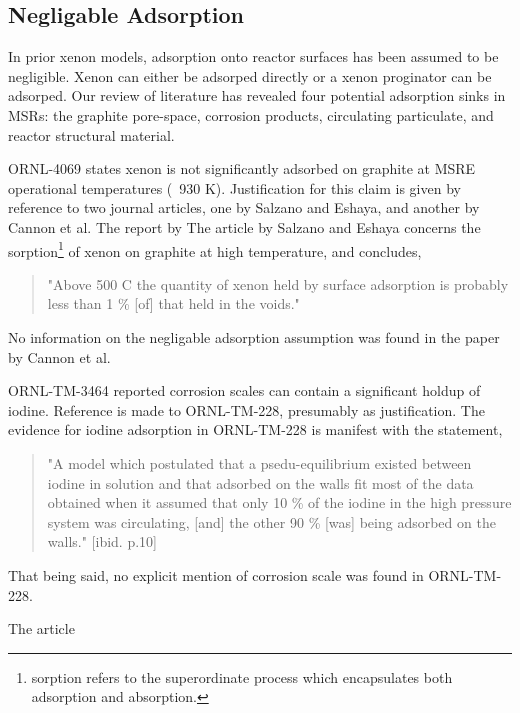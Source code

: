\subsection{Negligable Adsorption}
In prior xenon models, adsorption onto reactor surfaces has been assumed to be negligible.  Xenon can either be adsorped directly or a xenon proginator can be adsorped.  Our review of literature has revealed four potential adsorption sinks in MSRs: the graphite pore-space, corrosion products, circulating particulate, and reactor structural material. 

ORNL-4069 states xenon is not significantly adsorbed on graphite at MSRE operational temperatures (~930 K). \cite[p. 42]{ORNL4069}  Justification for this claim is given by reference to two journal articles, one by Salzano and Eshaya, and another by Cannon et al.  The report by The article by Salzano and Eshaya concerns the sorption\footnote{sorption refers to the superordinate process which encapsulates both adsorption and absorption.} of xenon on graphite at high temperature, and concludes,
\begin{quote}
    "Above 500 \degree C the quantity of xenon held by surface adsorption is probably less than 1 \% [of]  that held in the voids." \cite{Salzano1962}
\end{quote}
No information on the negligable adsorption assumption was found in the paper by Cannon et al. \cite{Cannon1962}

ORNL-TM-3464 reported corrosion scales can contain a significant holdup of iodine. \cite[p. 5]{ORNLTM3464} Reference is made to ORNL-TM-228, presumably as justification. \cite{Burch1962}   The evidence for iodine adsorption in ORNL-TM-228  is manifest with the statement,
\begin{quote}
"A model which postulated that a psedu-equilibrium existed between iodine in solution and that adsorbed on the walls fit most of the data obtained when it assumed that only 10 \% of the iodine in the high pressure system was circulating, [and] the other 90 \% [was] being adsorbed on the walls." [ibid. p.10]
\end{quote}
That being said, no explicit mention of corrosion scale was found in ORNL-TM-228.

The article